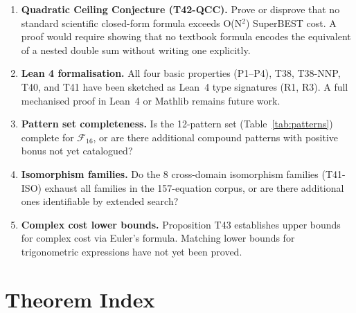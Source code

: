 \documentclass[12pt,a4paper]{article}
\theoremstyle{definition}
\begin{document}
\begin{enumerate}
  \item \textbf{Quadratic Ceiling Conjecture (T42-QCC).}
        Prove or disprove that no standard scientific closed-form formula
        exceeds O(N$^2$) SuperBEST cost.  A proof would require showing that
        no textbook formula encodes the equivalent of a nested double sum
        without writing one explicitly.

  \item \textbf{Lean 4 formalisation.}
        All four basic properties (P1--P4), T38, T38-NNP, T40, and T41 have
        been sketched as Lean~4 type signatures (R1, R3).  A full mechanised
        proof in Lean~4 or Mathlib remains future work.

  \item \textbf{Pattern set completeness.}
        Is the 12-pattern set (Table~\ref{tab:patterns}) complete for
        $\mathcal{F}_{16}$, or are there additional compound patterns with
        positive bonus not yet catalogued?

  \item \textbf{Isomorphism families.}
        Do the 8 cross-domain isomorphism families (T41-ISO) exhaust all
        families in the 157-equation corpus, or are there additional ones
        identifiable by extended search?

  \item \textbf{Complex cost lower bounds.}
        Proposition T43 establishes upper bounds for complex cost via Euler's
        formula.  Matching lower bounds for trigonometric expressions have not
        yet been proved.
\end{enumerate}

\section{Theorem Index}
\label{sec:index}
\end{document}
